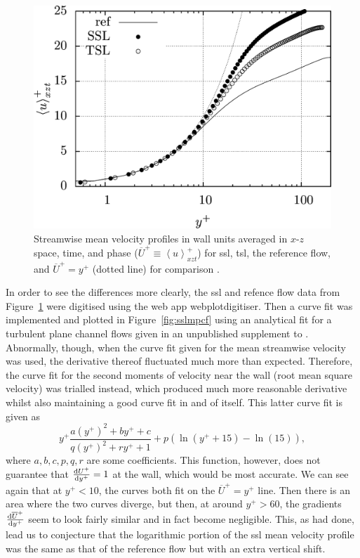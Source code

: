 \begin{figure}[htbp]
	\centering
	\includegraphics[width=0.7\linewidth]{project/fig/sslmeanprofile.png}
	\caption[Streamwise mean velocity profiles of SSL and reference flow]{Streamwise mean velocity profiles in wall units averaged in $x$-$z$ space, time, and phase ($\overline{U}^{+}\equiv \left<u \right>^{+}_{xzt}$) for \gls*{ssl}, \gls*{tsl}, the reference flow, and $\overline{U}^{+}=y^{+}$ (dotted line) for comparison \cite{viotti2009}.}
	\label{fig:sslmeanprofile}
\end{figure}

In order to see the differences more clearly, the  \gls*{ssl} and refence flow data from Figure~\ref{fig:sslmeanprofile} were digitised using the web app webplotdigitiser. Then a curve fit was implemented and plotted in Figure~\ref{fig:sslmpcf} using an analytical fit for a turbulent plane channel flows given in an unpublished supplement to \cite{chernyshenko2021}. Abnormally, though, when the curve fit given for the mean streamwise velocity was used, the derivative thereof fluctuated much more than expected. Therefore, the curve fit for the second moments of velocity near the wall (root mean square velocity) was trialled instead, which produced much more reasonable derivative whilst also maintaining a good curve fit in and of itself. This latter curve fit is given as
\begin{equation}
	y^{+}  \frac{a\left(y^{+}\right)^2 + by^{+} + c}{q\left(y^{+}\right)^2 + ry^{+} + 1} + p \left( \ln(y^{+}+15)-\ln(15)\right)\label{eq:curvefit}
,\end{equation}
where $a,b,c,p,q,r$ are some coefficients. This function, however, does not guarantee that $\dv{U^{+}}{y^{+}} =1$ at the wall, which would be most accurate. We can see again that at $y^{+}<10$, the curves both fit on the $\overline{U}^{+}=y^{+}$ line. Then there is an area where the two curves diverge, but then, at around $y^{+}>60$, the gradients $\dv{\overline{U}^{+}}{y^{+}} $ seem to look fairly similar and in fact become negligible. This, as \textcite{viotti2009} had done, lead us to conjecture that the logarithmic portion of the \gls*{ssl} mean velocity profile was the same as that of the reference flow but with an extra vertical shift.

